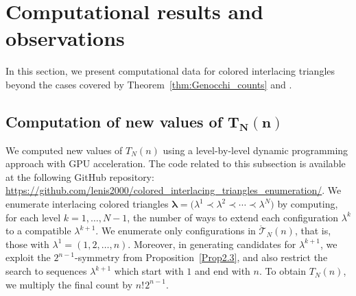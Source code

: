 \documentclass[pdftex]{sigma}
\numberwithin{equation}{section}
\newcommand{\ssp}{\hspace{1pt}}
\theoremstyle{definition}
\begin{document}
\section{Computational results and observations}\label{sec:enumeration}

In this section, we present computational data for colored interlacing triangles
beyond the cases covered by Theorem~\ref{thm:Genocchi_counts} and
\cite{gaetz2023bijection}.

\subsection[Computation of new values of T\_N(n)]{Computation of new values of $\boldsymbol{T_N(n)}$}
\label{subsec:computational_approach}

We computed new values of $T_N(n)$ using a level-by-level dynamic programming
approach with GPU acceleration.
The code related to this subsection is available at the following GitHub
repository:\!
\url{https://github.com/lenis2000/colored_interlacing_triangles_enumeration/}.\!
 We enumerate interlacing colored triangles
$\boldsymbol\lambda = \bigl(\lambda^1 \prec \lambda^2 \prec \cdots \prec \lambda^N\bigr)$
by computing, for each level $k = 1, \dots, N-1$, the number of ways to extend
each configuration $\lambda^k$ to a compatible $\lambda^{k+1}$.
We enumerate only configurations in $\mathring{\mathcal{T}}_N(n)$, that is,
those with $\lambda^1=(1,2,\dots,n)$.
Moreover, in generating candidates for $\lambda^{k+1}$, we exploit the
$2^{n-1}$-symmetry from Proposition~\ref{Prop2.3}, and also
restrict the search to sequences $\lambda^{k+1}$ which start with $1$ and end
with $n$.
To obtain $T_N(n)$, we multiply the final count by $n!\ssp 2^{n-1}$.
\end{document}
